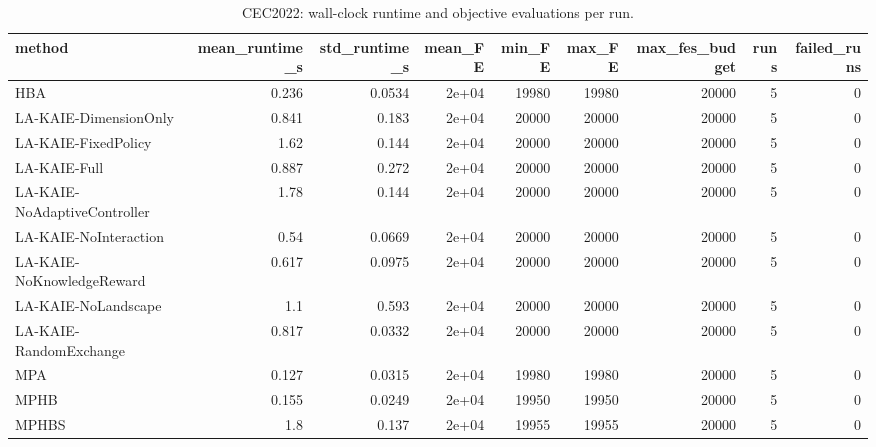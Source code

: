 \begin{table}[t]
\centering
\scriptsize
\caption{CEC2022: wall-clock runtime and objective evaluations per run.}
\label{tab:cec2022_runtime}
\begin{tabular}{lrrrrrrrr}
\toprule
method & mean\_runtime\_s & std\_runtime\_s & mean\_FE & min\_FE & max\_FE & max\_fes\_budget & runs & failed\_runs \\
\midrule
HBA & 0.236 & 0.0534 & 2e+04 & 19980 & 19980 & 20000 & 5 & 0 \\
LA-KAIE-DimensionOnly & 0.841 & 0.183 & 2e+04 & 20000 & 20000 & 20000 & 5 & 0 \\
LA-KAIE-FixedPolicy & 1.62 & 0.144 & 2e+04 & 20000 & 20000 & 20000 & 5 & 0 \\
LA-KAIE-Full & 0.887 & 0.272 & 2e+04 & 20000 & 20000 & 20000 & 5 & 0 \\
LA-KAIE-NoAdaptiveController & 1.78 & 0.144 & 2e+04 & 20000 & 20000 & 20000 & 5 & 0 \\
LA-KAIE-NoInteraction & 0.54 & 0.0669 & 2e+04 & 20000 & 20000 & 20000 & 5 & 0 \\
LA-KAIE-NoKnowledgeReward & 0.617 & 0.0975 & 2e+04 & 20000 & 20000 & 20000 & 5 & 0 \\
LA-KAIE-NoLandscape & 1.1 & 0.593 & 2e+04 & 20000 & 20000 & 20000 & 5 & 0 \\
LA-KAIE-RandomExchange & 0.817 & 0.0332 & 2e+04 & 20000 & 20000 & 20000 & 5 & 0 \\
MPA & 0.127 & 0.0315 & 2e+04 & 19980 & 19980 & 20000 & 5 & 0 \\
MPHB & 0.155 & 0.0249 & 2e+04 & 19950 & 19950 & 20000 & 5 & 0 \\
MPHBS & 1.8 & 0.137 & 2e+04 & 19955 & 19955 & 20000 & 5 & 0 \\
\bottomrule
\end{tabular}
\end{table}
